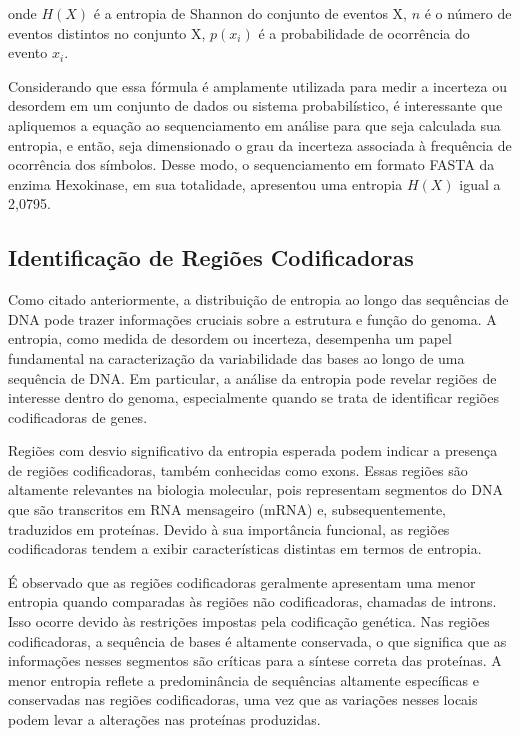 \documentclass{article}
\begin{document}
onde \(H(X)\) é a entropia de Shannon do conjunto de eventos  X, \(n\) é o número de eventos distintos no conjunto X, \(p(x_i)\) é a probabilidade de ocorrência do evento \(x_i\).

Considerando que essa fórmula é amplamente utilizada para medir a incerteza ou desordem em um conjunto de dados ou sistema probabilístico, é interessante que apliquemos a equação ao sequenciamento em análise para que seja calculada sua entropia, e então, seja dimensionado o grau da incerteza associada à frequência de ocorrência dos símbolos. 
Desse modo, o sequenciamento em formato FASTA da enzima Hexokinase, em sua totalidade, apresentou uma entropia \(H(X)\) igual a 2,0795.

\subsection{Identificação de Regiões Codificadoras}

Como citado anteriormente, a distribuição de entropia ao longo das sequências de DNA pode trazer informações cruciais sobre a estrutura e função do genoma. A entropia, como medida de desordem ou incerteza, desempenha um papel fundamental na caracterização da variabilidade das bases ao longo de uma sequência de DNA. Em particular, a análise da entropia pode revelar regiões de interesse dentro do genoma, especialmente quando se trata de identificar regiões codificadoras de genes.

Regiões com desvio significativo da entropia esperada podem indicar a presença de regiões codificadoras, também conhecidas como exons. Essas regiões são altamente relevantes na biologia molecular, pois representam segmentos do DNA que são transcritos em RNA mensageiro (mRNA) e, subsequentemente, traduzidos em proteínas. Devido à sua importância funcional, as regiões codificadoras tendem a exibir características distintas em termos de entropia.

É observado que as regiões codificadoras geralmente apresentam uma menor entropia quando comparadas às regiões não codificadoras, chamadas de introns. Isso ocorre devido às restrições impostas pela codificação genética. Nas regiões codificadoras, a sequência de bases é altamente conservada, o que significa que as informações nesses segmentos são críticas para a síntese correta das proteínas. A menor entropia reflete a predominância de sequências altamente específicas e conservadas nas regiões codificadoras, uma vez que as variações nesses locais podem levar a alterações nas proteínas produzidas.
\end{document}
